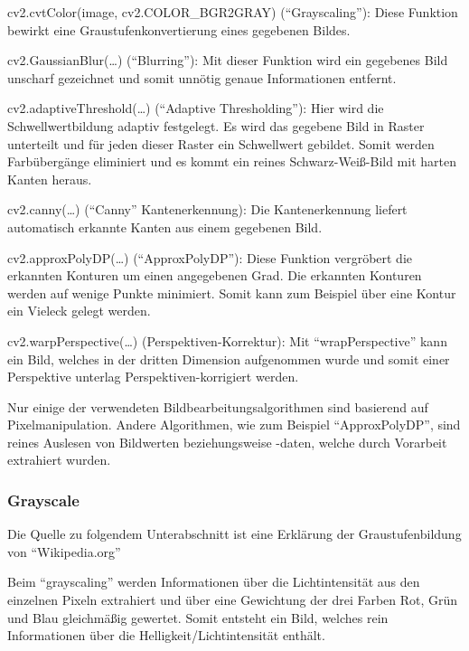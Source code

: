 \begin{compactitem}
  \item cv2.cvtColor(image, cv2.COLOR\_BGR2GRAY) (``Grayscaling''): Diese Funktion bewirkt eine Graustufenkonvertierung eines gegebenen Bildes.
  \item cv2.GaussianBlur(\dots) (``Blurring''): Mit dieser Funktion wird ein gegebenes Bild unscharf gezeichnet und somit unnötig genaue Informationen entfernt.
  \item cv2.adaptiveThreshold(\dots) (``Adaptive Thresholding''): Hier wird die Schwellwertbildung adaptiv festgelegt. Es wird das gegebene Bild in Raster unterteilt und für jeden dieser Raster ein Schwellwert gebildet. Somit werden Farbübergänge eliminiert und es kommt ein reines Schwarz-Weiß-Bild mit harten Kanten heraus.
  \item cv2.canny(\dots) (``Canny'' Kantenerkennung): Die Kantenerkennung liefert automatisch erkannte Kanten aus einem gegebenen Bild.
  \item cv2.approxPolyDP(\dots) (``ApproxPolyDP''): Diese Funktion vergröbert die erkannten Konturen um einen angegebenen Grad. Die erkannten Konturen werden auf wenige Punkte minimiert. Somit kann zum Beispiel über eine Kontur ein Vieleck gelegt werden.
  \item cv2.warpPerspective(\dots) (Perspektiven-Korrektur): Mit ``wrapPerspective'' kann ein Bild, welches in der dritten Dimension aufgenommen wurde und somit einer Perspektive unterlag Perspektiven-korrigiert werden.
\end{compactitem}

Nur einige der verwendeten Bildbearbeitungsalgorithmen sind basierend auf Pixelmanipulation. Andere Algorithmen, wie zum Beispiel ``ApproxPolyDP'', sind reines Auslesen von Bildwerten beziehungsweise -daten, welche durch Vorarbeit extrahiert wurden. \cite{opencvdocs}


\subsubsection{Grayscale}\label{maai:grayscale}
Die Quelle zu folgendem Unterabschnitt ist eine Erklärung der Graustufenbildung von ``Wikipedia.org'' \cite{grascale:cite}

Beim ``grayscaling'' werden Informationen über die Lichtintensität aus den einzelnen Pixeln extrahiert und über eine Gewichtung der drei Farben Rot, Grün und Blau gleichmäßig gewertet. Somit entsteht ein Bild, welches rein Informationen über die Helligkeit/Lichtintensität enthält.


